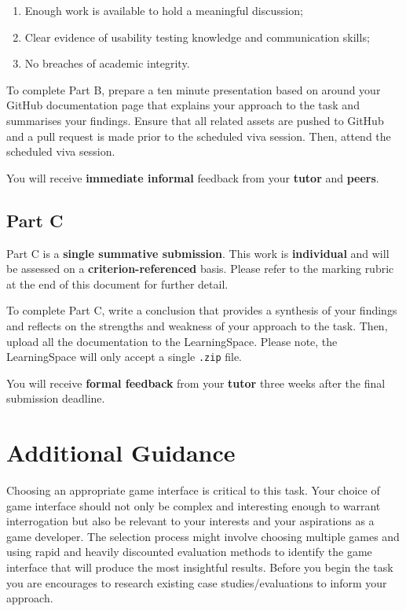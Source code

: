 \documentclass{../fal_assignment}
\begin{document}
\begin{enumerate}[label=(\alph*)]
	\item Enough work is available to hold a meaningful discussion; 
	\item Clear evidence of usability testing knowledge and communication skills; 
	\item No breaches of academic integrity. 
\end{enumerate}

To complete Part B, prepare a ten minute presentation based on around your GitHub documentation page that explains your approach to the task and summarises your findings. Ensure that all related assets are pushed to GitHub and a pull request is made prior to the scheduled viva session. Then, attend the scheduled viva session. %

You will receive \textbf{immediate informal} feedback from your \textbf{tutor} and \textbf{peers}.

\subsection*{Part C}

Part C is a \textbf{single summative submission}. This work is \textbf{individual} and will be assessed on a \textbf{criterion-referenced} basis. Please refer to the marking rubric at the end of this document for further detail.

To complete Part C, write a conclusion that provides a synthesis  of your findings and reflects on the strengths and weakness of your approach to the task. Then, upload all the documentation to the LearningSpace. Please note, the LearningSpace will only accept a single \texttt{.zip} file.

You will receive \textbf{formal feedback} from your \textbf{tutor} three weeks after the final submission deadline.

\section*{Additional Guidance}
Choosing an appropriate game interface is critical to this task. Your choice of game interface should not only be complex and interesting enough to warrant interrogation but also be relevant to your interests and your aspirations as a game developer. The selection process might involve choosing multiple games and using rapid and heavily discounted evaluation methods to identify the game interface that will produce the most insightful results. Before you begin the task you are encourages to research existing case studies/evaluations to inform your approach. 
\end{document}
